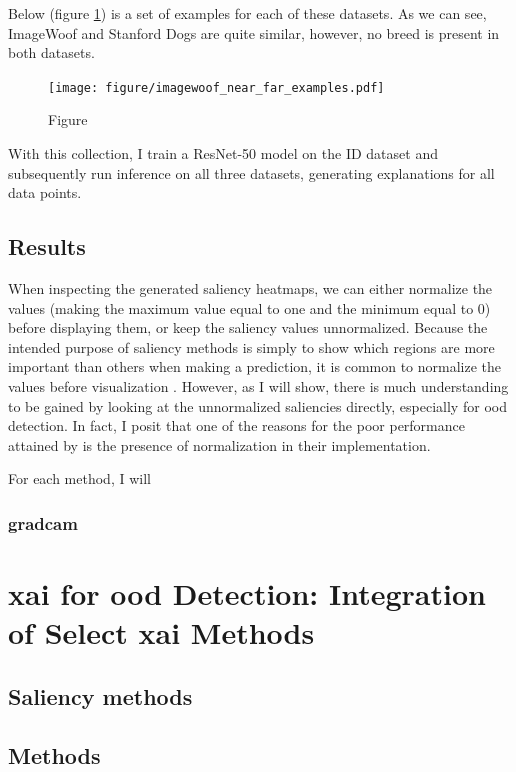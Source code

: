 \documentclass[UKenglish]{uiomasterthesis} %
\theoremstyle{definition}
\begin{document}
Below (figure \ref{fig:imagewoof_examples}) is a set of examples for each of these datasets. As we can see, ImageWoof and Stanford Dogs are quite similar, however, no breed is present in both datasets.

\begin{figure}[h]
\centerline{\texttt{[image: figure/imagewoof\_near\_far\_examples.pdf]}}
\caption{Figure}
\label{fig:imagewoof_examples}
\end{figure}

With this collection, I train a ResNet-50 model on the ID dataset and subsequently run inference on all three datasets, generating explanations for all data points.

\section{Results}

When inspecting the generated saliency heatmaps, we can either normalize the values (making the maximum value equal to one and the minimum equal to 0) before displaying them, or keep the saliency values unnormalized. Because the intended purpose of saliency methods is simply to show which regions are more important than others when making a prediction, it is common to normalize the values before visualization \cite{molnar, gradcam}. However, as I will show, there is much understanding to be gained by looking at the unnormalized saliencies directly, especially for \ac{ood} detection. In fact, I posit that one of the reasons for the poor performance attained by \cite{martinez} is the presence of normalization in their implementation.

For each method, I will 

\subsection{\ac{gradcam}}




\chapter{\ac{xai} for \ac{ood} Detection: Integration of Select \ac{xai} Methods}




\section{Saliency methods}



\section{Methods}






\backmatter{}
\printbibliography{}
\end{document}
